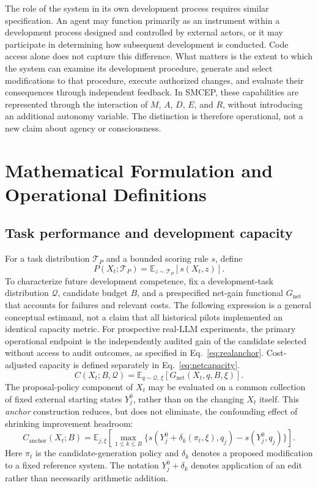 \documentclass[11pt,a4paper]{article}
\begin{document}
The role of the system in its own development process requires similar specification. An agent may function primarily as an instrument within a development process designed and controlled by external actors, or it may participate in determining how subsequent development is conducted. Code access alone does not capture this difference. What matters is the extent to which the system can examine its development procedure, generate and select modifications to that procedure, execute authorized changes, and evaluate their consequences through independent feedback. In SMCEP, these capabilities are represented through the interaction of $M$, $A$, $D$, $E$, and $R$, without introducing an additional autonomy variable. The distinction is therefore operational, not a new claim about agency or consciousness.

\section{Mathematical Formulation and Operational Definitions}
\subsection{Task performance and development capacity}
For a task distribution $\mathcal{T}_P$ and a bounded scoring rule $s$, define
\begin{equation}
P(X_t;\mathcal{T}_P)=\mathbb{E}_{z\sim\mathcal{T}_P}[s(X_t,z)].\label{eq:performance}
\end{equation}
To characterize future development competence, fix a development-task distribution $\mathcal{Q}$, candidate budget $B$, and a prespecified net-gain functional $G_{\mathrm{net}}$ that accounts for failures and relevant costs. The following expression is a general conceptual estimand, not a claim that all historical pilots implemented an identical capacity metric. For prospective real-LLM experiments, the primary operational endpoint is the independently audited gain of the candidate selected without access to audit outcomes, as specified in Eq.~\eqref{eq:realanchor}. Cost-adjusted capacity is defined separately in Eq.~\eqref{eq:netcapacity}.
\begin{equation}
C(X_t;B,\mathcal{Q})=\mathbb{E}_{q\sim\mathcal{Q},\,\xi}\left[G_{\mathrm{net}}(X_t,q,B,\xi)\right].\label{eq:capacity}
\end{equation}
The proposal-policy component of $X_t$ may be evaluated on a common collection of fixed external starting states $Y_j^0$, rather than on the changing $X_t$ itself. This \emph{anchor} construction reduces, but does not eliminate, the confounding effect of shrinking improvement headroom:
\begin{equation}
C_{\mathrm{anchor}}(X_t;B)=\mathbb{E}_{j,\xi}\left[\max_{1\leq k\leq B}\{s(Y_j^0+\delta_k(\pi_t,\xi),q_j)-s(Y_j^0,q_j)\}\right].\label{eq:anchor}
\end{equation}
Here $\pi_t$ is the candidate-generation policy and $\delta_k$ denotes a proposed modification to a fixed reference system. The notation $Y_j^0+\delta_k$ denotes application of an edit rather than
necessarily arithmetic addition.
\end{document}
